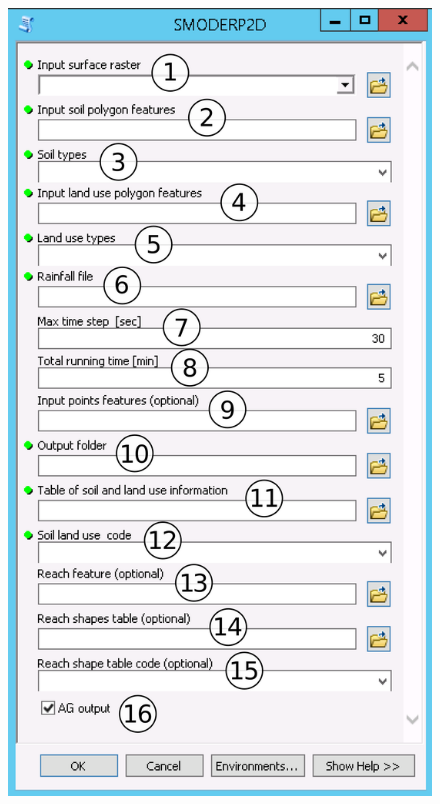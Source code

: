   \begin{figure}[t!]
    \centering
    \begin{minipage}[t]{.45\textwidth}
      \centering
      \vspace{0pt}
      \includegraphics[width=\textwidth]{./img/toolboxpopis4.png}
    \end{minipage}\hfill
    \begin{minipage}[t]{.55\textwidth}

\end{minipage}
\end{figure}
